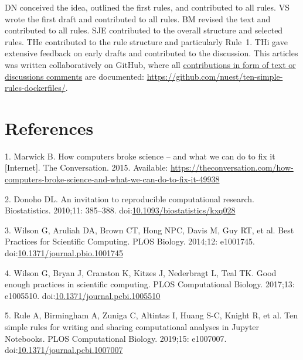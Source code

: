 \documentclass[10pt,letterpaper]{article}
\begin{document}
DN conceived the idea, outlined the first rules, and contributed to all
rules. VS wrote the first draft and contributed to all rules. BM revised
the text and contributed to all rules. SJE contributed to the overall
structure and selected rules. THe contributed to the rule structure and
particularly Rule~1. THi gave extensive feedback on early drafts and
contributed to the discussion. This articles was written collaboratively
on GitHub, where all
\href{https://github.com/nuest/ten-simple-rules-dockerfiles/graphs/contributors}{contributions
in form of text or discussions comments} are documented:
\url{https://github.com/nuest/ten-simple-rules-dockerfiles/}.

\hypertarget{references}{%
\section*{References}\label{references}}

\hypertarget{refs}{}
\leavevmode\hypertarget{ref-marwick_how_2015}{}%
1. Marwick B. How computers broke science -- and what we can do to fix
it {[}Internet{]}. The Conversation. 2015. Available:
\url{https://theconversation.com/how-computers-broke-science-and-what-we-can-do-to-fix-it-49938}

\leavevmode\hypertarget{ref-donoho_invitation_2010}{}%
2. Donoho DL. An invitation to reproducible computational research.
Biostatistics. 2010;11: 385--388.
doi:\href{https://doi.org/10.1093/biostatistics/kxq028}{10.1093/biostatistics/kxq028}

\leavevmode\hypertarget{ref-wilson_best_2014}{}%
3. Wilson G, Aruliah DA, Brown CT, Hong NPC, Davis M, Guy RT, et al.
Best Practices for Scientific Computing. PLOS Biology. 2014;12:
e1001745.
doi:\href{https://doi.org/10.1371/journal.pbio.1001745}{10.1371/journal.pbio.1001745}

\leavevmode\hypertarget{ref-wilson_good_2017}{}%
4. Wilson G, Bryan J, Cranston K, Kitzes J, Nederbragt L, Teal TK. Good
enough practices in scientific computing. PLOS Computational Biology.
2017;13: e1005510.
doi:\href{https://doi.org/10.1371/journal.pcbi.1005510}{10.1371/journal.pcbi.1005510}

\leavevmode\hypertarget{ref-rule_ten_2019}{}%
5. Rule A, Birmingham A, Zuniga C, Altintas I, Huang S-C, Knight R, et
al. Ten simple rules for writing and sharing computational analyses in
Jupyter Notebooks. PLOS Computational Biology. 2019;15: e1007007.
doi:\href{https://doi.org/10.1371/journal.pcbi.1007007}{10.1371/journal.pcbi.1007007}
\end{document}
